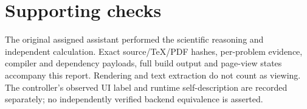 \documentclass[10pt]{article}
\begin{document}
\section*{Supporting checks}
The original assigned assistant performed the scientific reasoning and independent calculation. Exact source/TeX/PDF hashes, per-problem evidence, compiler and dependency payloads, full build output and page-view states accompany this report. Rendering and text extraction do not count as viewing. The controller’s observed UI label and runtime self-description are recorded separately; no independently verified backend equivalence is asserted.\par
\end{document}
